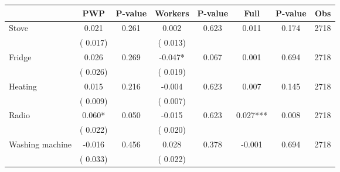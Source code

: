 
\begin{tabular}{l*{7}{c}}\hline&\multicolumn{1}{c}{PWP}&\multicolumn{1}{c}{P-value}&\multicolumn{1}{c}{Workers}&\multicolumn{1}{c}{P-value}&\multicolumn{1}{c}{Full}&\multicolumn{1}{c}{P-value}&\multicolumn{1}{c}{Obs} \\ \hline

 Stove       &              0.021       &        0.261  &              0.002       &        0.623  &              0.011       &              0.174 &  2718 \\ 
                       &       (       0.017)             &                               &       (       0.013)                     &                               &                                               &                                &                      \\ 

 Fridge       &              0.026       &        0.269  &             -0.047*       &        0.067  &              0.001       &              0.694 &  2718 \\ 
                       &       (       0.026)             &                               &       (       0.019)                     &                               &                                               &                                &                      \\ 

 Heating       &              0.015       &        0.216  &             -0.004       &        0.623  &              0.007       &              0.145 &  2718 \\ 
                       &       (       0.009)             &                               &       (       0.007)                     &                               &                                               &                                &                      \\ 

 Radio       &              0.060*       &        0.050  &             -0.015       &        0.623  &              0.027***       &              0.008 &  2718 \\ 
                       &       (       0.022)             &                               &       (       0.020)                     &                               &                                               &                                &                      \\ 

 Washing machine       &             -0.016       &        0.456  &              0.028       &        0.378  &             -0.001       &              0.694 &  2718 \\ 
                       &       (       0.033)             &                               &       (       0.022)                     &                               &                                               &                                &                      \\ 


\end{tabular}
